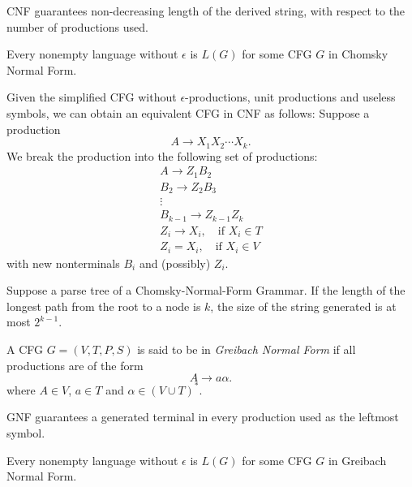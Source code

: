 CNF guarantees non-decreasing length of the derived string, with respect to the
number of productions used.

\begin{theorem}
  Every nonempty language without $\epsilon$ is $L(G)$ for some CFG $G$ in
  Chomsky Normal Form.
\end{theorem}

Given the simplified CFG without $\epsilon$-productions, unit productions and
useless symbols, we can obtain an equivalent CFG in CNF as follows:
Suppose a production 
\[A\to X_1X_2\cdots X_k.\]
We break the production into the following set of productions:
\begin{gather*}
  A\to Z_1B_2\\
  B_2\to Z_2B_3\\
      \vdots\\
  B_{k-1}\to Z_{k-1}Z_k\\
  Z_i\to X_i,\quad\text{if }X_i\in T\\
  Z_i=X_i,\quad\text{if }X_i\in V
\end{gather*}
with new nonterminals $B_i$ and (possibly) $Z_i$. 

\begin{theorem}
  Suppose a parse tree of a Chomsky-Normal-Form Grammar. If the length of the
  longest path from the root to a node is $k$, the size of the string generated
  is at most $2^{k-1}$.
\end{theorem}

\begin{definition}
  A CFG $G=\left( V,T,P,S \right) $ is said to be in \textit{Greibach Normal
  Form} if all productions are of the form 
  \[A\to a\alpha.\] 
  where $A\in V$, $a\in T$ and $\alpha\in {\left( V\cup T \right)}^{*}$.
\end{definition}

GNF guarantees a generated terminal in every production used as the leftmost
symbol.

\begin{theorem}
  Every nonempty language without $\epsilon$ is $L(G)$ for some CFG $G$ in
  Greibach Normal Form.
\end{theorem}


